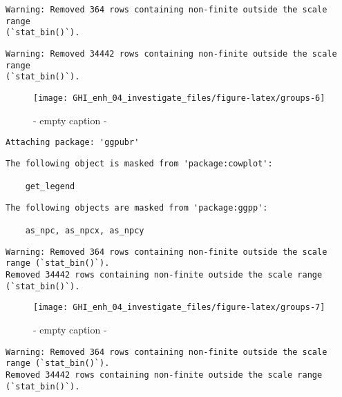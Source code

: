 \documentclass[
  10pt,
  a4paper,oneside]{article}
\begin{document}
\begin{verbatim}
Warning: Removed 364 rows containing non-finite outside the scale range
(`stat_bin()`).
\end{verbatim}

\begin{verbatim}
Warning: Removed 34442 rows containing non-finite outside the scale range
(`stat_bin()`).
\end{verbatim}

\begin{figure}[H]

{\centering \texttt{[image: GHI\_enh\_04\_investigate\_files/figure-latex/groups-6]} 

}

\caption{ - empty caption - }\label{fig:groups-6}
\end{figure}

\begin{verbatim}
Attaching package: 'ggpubr'
\end{verbatim}

\begin{verbatim}
The following object is masked from 'package:cowplot':

    get_legend
\end{verbatim}

\begin{verbatim}
The following objects are masked from 'package:ggpp':

    as_npc, as_npcx, as_npcy
\end{verbatim}

\begin{verbatim}
Warning: Removed 364 rows containing non-finite outside the scale range (`stat_bin()`).
Removed 34442 rows containing non-finite outside the scale range (`stat_bin()`).
\end{verbatim}

\begin{figure}[H]

{\centering \texttt{[image: GHI\_enh\_04\_investigate\_files/figure-latex/groups-7]} 

}

\caption{ - empty caption - }\label{fig:groups-7}
\end{figure}

\begin{verbatim}
Warning: Removed 364 rows containing non-finite outside the scale range (`stat_bin()`).
Removed 34442 rows containing non-finite outside the scale range (`stat_bin()`).
\end{verbatim}
\end{document}
